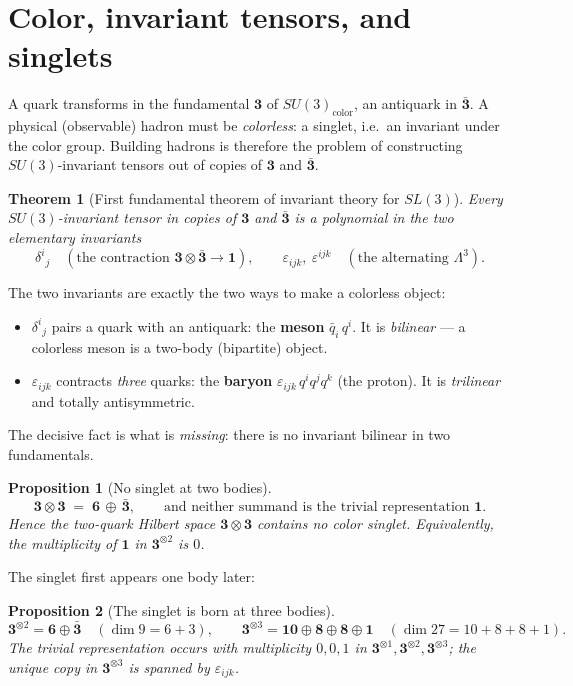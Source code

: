 \documentclass[11pt]{article}
\newtheorem{theorem}{Theorem}
\newtheorem{proposition}{Proposition}
\theoremstyle{definition}
\newcommand{\rep}[1]{\mathbf{#1}}      %
\newcommand{\triv}{\mathbf{1}}         %
\begin{document}
\section{Color, invariant tensors, and singlets}

A quark transforms in the fundamental $\rep{3}$ of $SU(3)_{\text{color}}$, an
antiquark in $\bar{\rep{3}}$. A physical (observable) hadron must be
\emph{colorless}: a singlet, i.e.\ an invariant under the color group. Building
hadrons is therefore the problem of constructing $SU(3)$-invariant tensors out of
copies of $\rep{3}$ and $\bar{\rep 3}$.

\begin{theorem}[First fundamental theorem of invariant theory for $SL(3)$]
Every $SU(3)$-invariant tensor in copies of $\rep{3}$ and $\bar{\rep 3}$ is a
polynomial in the two elementary invariants
\[
  \delta^{i}{}_{j}\quad(\text{the contraction }\rep{3}\otimes\bar{\rep 3}\to\triv),
  \qquad
  \varepsilon_{ijk},\ \varepsilon^{ijk}\quad(\text{the alternating }\Lambda^3).
\]
\end{theorem}

The two invariants are exactly the two ways to make a colorless object:
\begin{itemize}[nosep]
  \item $\delta^{i}{}_{j}$ pairs a quark with an antiquark: the \textbf{meson}
  $\bar q_i\,q^i$. It is \emph{bilinear} --- a colorless meson is a two-body
  (bipartite) object.
  \item $\varepsilon_{ijk}$ contracts \emph{three} quarks:
  the \textbf{baryon} $\varepsilon_{ijk}\,q^i q^j q^k$ (the proton). It is
  \emph{trilinear} and totally antisymmetric.
\end{itemize}

The decisive fact is what is \emph{missing}: there is no invariant bilinear in two
fundamentals.

\begin{proposition}[No singlet at two bodies]
\label{prop:nosinglet}
\[
  \rep{3}\otimes\rep{3} \;=\; \rep{6}\,\oplus\,\bar{\rep 3},
  \qquad\text{and neither summand is the trivial representation }\triv .
\]
Hence the two-quark Hilbert space $\rep 3\otimes\rep 3$ contains \emph{no} color
singlet. Equivalently, the multiplicity of $\triv$ in $\rep 3^{\otimes 2}$ is $0$.
\end{proposition}

The singlet first appears one body later:
\begin{proposition}[The singlet is born at three bodies]
\label{prop:three}
\[
  \rep 3^{\otimes 2}=\rep 6\oplus\bar{\rep 3}
  \quad(\dim 9 = 6+3),
  \qquad
  \rep 3^{\otimes 3}=\rep{10}\oplus\rep 8\oplus\rep 8\oplus\triv
  \quad(\dim 27 = 10+8+8+1).
\]
The trivial representation occurs with multiplicity $0,0,1$ in
$\rep 3^{\otimes 1},\rep 3^{\otimes 2},\rep 3^{\otimes 3}$; the unique copy in
$\rep 3^{\otimes 3}$ is spanned by $\varepsilon_{ijk}$.
\end{proposition}
\end{document}
